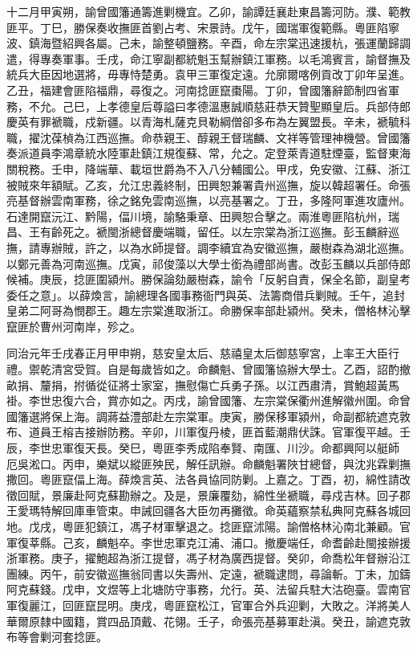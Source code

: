 \begin{pinyinscope}
十二月甲寅朔，諭曾國籓通籌進剿機宜。乙卯，諭譚廷襄赴東昌籌河防。濮、範教匪平。丁巳，勝保奏收撫匪首劉占考、宋景詩。戊午，國瑞軍復範縣。粵匪陷寧波、鎮海暨紹興各屬。己未，諭整頓鹽務。辛酉，命左宗棠迅速援杭，張運蘭歸調遣，得專奏軍事。壬戌，命江寧副都統魁玉幫辦鎮江軍務。以毛鴻賓言，諭督撫及統兵大臣因地選將，毋專恃楚勇。袁甲三軍復定遠。允廓爾喀例貢改丁卯年呈進。乙丑，福建會匪陷福鼎，尋復之。河南捻匪竄棗陽。丁卯，曾國籓辭節制四省軍務，不允。己巳，上孝德皇后尊謚曰孝德溫惠誠順慈莊恭天贊聖顯皇后。兵部侍郎慶英有罪褫職，戍新疆。以青海札薩克貝勒綱僧卻多布為左翼盟長。辛未，褫毓科職，擢沈葆楨為江西巡撫。命恭親王、醇親王督瑞麟、文祥等管理神機營。曾國籓奏派道員李鴻章統水陸軍赴鎮江規復蘇、常，允之。定登萊青道駐煙臺，監督東海關稅務。壬申，降端華、載垣世爵為不入八分輔國公。甲戌，免安徽、江蘇、浙江被賊來年額賦。乙亥，允江忠義終制，田興恕兼署貴州巡撫，旋以韓超署任。命張亮基督辦雲南軍務，徐之銘免雲南巡撫，以亮基署之。丁丑，多隆阿軍進攻廬州。石達開竄沅江、黔陽，偪川境，諭駱秉章、田興恕合擊之。兩淮粵匪陷杭州，瑞昌、王有齡死之。褫閩浙總督慶端職，留任。以左宗棠為浙江巡撫。彭玉麟辭巡撫，請專辦賊，許之，以為水師提督。調李續宜為安徽巡撫，嚴樹森為湖北巡撫。以鄭元善為河南巡撫。戊寅，祁俊藻以大學士銜為禮部尚書。改彭玉麟以兵部侍郎候補。庚辰，捻匪圍潁州。勝保論劾嚴樹森，諭令「反躬自責，保全名節，副皇考委任之意」。以薛煥言，諭總理各國事務衙門與英、法籌商借兵剿賊。壬午，追封皇弟二阿哥為憫郡王。趣左宗棠進取浙江。命勝保率部赴潁州。癸未，僧格林沁擊竄匪於曹州河南岸，殄之。

同治元年壬戌春正月甲申朔，慈安皇太后、慈禧皇太后御慈寧宮，上率王大臣行禮。禦乾清宮受賀。自是每歲皆如之。命麟魁、曾國籓協辦大學士。乙酉，詔酌撤畝捐、釐捐，拊循從征將士家室，撫慰傷亡兵勇子孫。以江西肅清，賞鮑超黃馬褂。李世忠復六合，賞亦如之。丙戌，諭曾國籓、左宗棠保衢州進解徽州圍。命曾國籓選將保上海。調蔣益澧部赴左宗棠軍。庚寅，勝保移軍潁州，命副都統遮克敦布、道員王榕吉接辦防務。辛卯，川軍復丹棱，匪首藍潮鼎伏誅。官軍復平越。壬辰，李世忠軍復天長。癸巳，粵匪李秀成陷奉賢、南匯、川沙。命都興阿以艇師厄吳淞口。丙申，樂斌以縱匪殃民，解任訊辦。命麟魁署陜甘總督，與沈兆霖剿撫撒回。粵匪竄偪上海。薛煥言英、法各員協同防剿。上嘉之。丁酉，初，綿性請改徵回賦，景廉赴阿克蘇勘辦之。及是，景廉覆劾，綿性坐褫職，尋戍吉林。回子郡王愛瑪特解回庫車管束。申誡回疆各大臣勿再攤徵。命英蘊察禁私典阿克蘇各城回地。戊戌，粵匪犯鎮江，馮子材軍擊退之。捻匪竄沭陽。諭僧格林沁南北兼顧。官軍復莘縣。己亥，麟魁卒。李世忠軍克江浦、浦口。撤慶端任，命耆齡赴閩接辦援浙軍務。庚子，擢鮑超為浙江提督，馮子材為廣西提督。癸卯，命喬松年督辦沿江團練。丙午，前安徽巡撫翁同書以失壽州、定遠，褫職逮問，尋論斬。丁未，加鑄阿克蘇錢。戊申，文煜等上北塘防守事務，允行。英、法留兵駐大沽砲臺。雲南官軍復麗江，回匪竄昆明。庚戌，粵匪竄松江，官軍合外兵迎剿，大敗之。洋將美人華爾原隸中國籍，賞四品頂戴、花翎。壬子，命張亮基募軍赴滇。癸丑，諭遮克敦布等會剿河套捻匪。


\end{pinyinscope}
